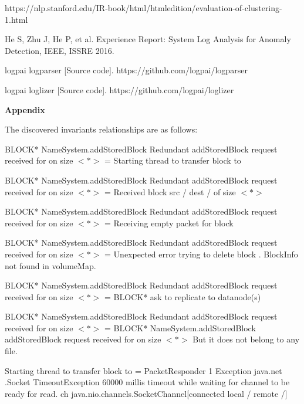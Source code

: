 \documentclass[12pt,a4paper]{article}
\begin{document}
	\vspace{0.2cm}
	\noindent[2] https://nlp.stanford.edu/IR-book/html/htmledition/evaluation-of-clustering-1.html
	
	\vspace{0.2cm}
	\noindent[3] He S, Zhu J, He P, et al. Experience Report: System Log Analysis for Anomaly Detection, IEEE, ISSRE 2016.
	
	\vspace{0.2cm}
	\noindent [4] logpai logparser [Source code]. https://github.com/logpai/logparser
	
	\vspace{0.2cm}
	\noindent [5] logpai loglizer [Source code]. https://github.com/logpai/loglizer
	
	\newpage
	\noindent \textbf{\huge Appendix}
	
	\vspace{0.5cm}
	\noindent The discovered invariants relationships are as follows:
	\vspace{0.3cm}
	
	\noindent BLOCK* NameSystem.addStoredBlock Redundant addStoredBlock request received for on size $<*>$ = Starting thread to transfer block to
	
	\noindent BLOCK* NameSystem.addStoredBlock Redundant addStoredBlock request received for on size $<*>$ = Received block src / dest / of size $<*>$
	
	\noindent BLOCK* NameSystem.addStoredBlock Redundant addStoredBlock request received for on size $<*>$ = Receiving empty packet for block
	
	\noindent BLOCK* NameSystem.addStoredBlock Redundant addStoredBlock request received for on size $<*>$ = Unexpected error trying to delete block . BlockInfo not found in volumeMap.
	
	\noindent BLOCK* NameSystem.addStoredBlock Redundant addStoredBlock request received for on size $<*>$ = BLOCK* ask to replicate to datanode(s)
	
	\noindent BLOCK* NameSystem.addStoredBlock Redundant addStoredBlock request received for on size $<*>$ = BLOCK* NameSystem.addStoredBlock addStoredBlock request received for on size $<*>$ But it does not belong to any file.
	
	\noindent Starting thread to transfer block to = PacketResponder 1 Exception java.net .Socket TimeoutException 60000 millis timeout while waiting for channel to be ready for read. ch java.nio.channels.SocketChannel[connected local / remote /]
	
\end{document}
